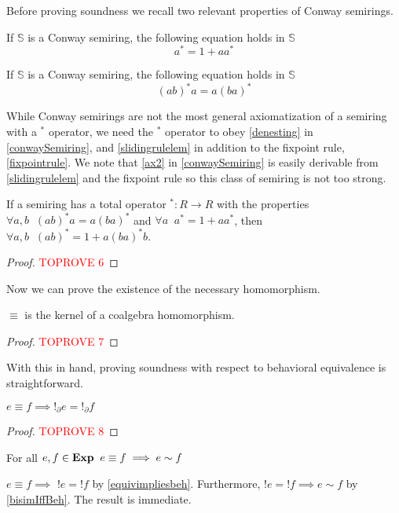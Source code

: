 \documentclass[a4paper,UKenglish,cleveref, autoref, thm-restate]{lipics-v2021}
\newcommand{\Exp}{\textbf{\upshape{Exp}}}
\theoremstyle{plain}\newtheoremrep{thm}{Theorem}[section]
\begin{document}
\begin{toappendix}
		Before proving soundness we recall two relevant properties of Conway semirings.
		\begin{lem} \label{fixpointrule}
			If $\mathbb S$ is a Conway semiring, the following equation holds in $\mathbb S$
			$$
				a^* = 1+aa^*
			$$ 
		\end{lem}
		\begin{lem} \label{slidingrulelem}
			If $\mathbb S$ is a Conway semiring, the following equation holds in $\mathbb S$
			$$
				(ab)^*a = a(ba)^*
			$$
		\end{lem}
		
		While Conway semirings are not the most general axiomatization of a semiring with a $^*$ operator, we need the $^*$ operator to obey \cref{denesting} in \cref{conwaySemiring}, and \cref{slidingrulelem} in addition to the fixpoint rule, \cref{fixpointrule}. We note that \ref{ax2} in \cref{conwaySemiring} is easily derivable from \cref{slidingrulelem} and the fixpoint rule so this class of semiring is not too strong.
		\begin{lem}
			If a semiring has a total operator $^*:R \to R$ with the properties $\forall a,b\;\; (ab)^*a = a(ba)^*$ and $\forall a\;\; a^* = 1+aa^*$, then $\forall a,b\;\; (ab)^* = 1+a(ba)^*b$.
		\end{lem}
		\begin{proof}\textcolor{red}{TOPROVE 6}\end{proof}
		Now we can prove the existence of the necessary homomorphism.
		\begin{lem}
			$\equiv$ is the kernel of a coalgebra homomorphism.\label{SoundnessMorphism}
		\end{lem}
		\begin{proof}\textcolor{red}{TOPROVE 7}\end{proof}
		With this in hand, proving soundness with respect to behavioral equivalence is straightforward.
		\begin{thm} \label{equivimpliesbeh}
			$e \equiv f \implies !_\partial e = !_\partial f$
		\end{thm}
		\begin{proof}\textcolor{red}{TOPROVE 8}\end{proof}
	\end{toappendix}
	\begin{correp}[Soundness]
		For all $e,f \in \Exp\;\; e\equiv f \implies e \sim f$\label{soundness}
	\end{correp}
	\begin{appendixproof}
		$e \equiv f \implies$ $!e = !f$ by \cref{equivimpliesbeh}. Furthermore, $!e = !f \implies e \sim f$ by \cref{bisimIffBeh}. The result is immediate.
	\end{appendixproof}
\end{document}
